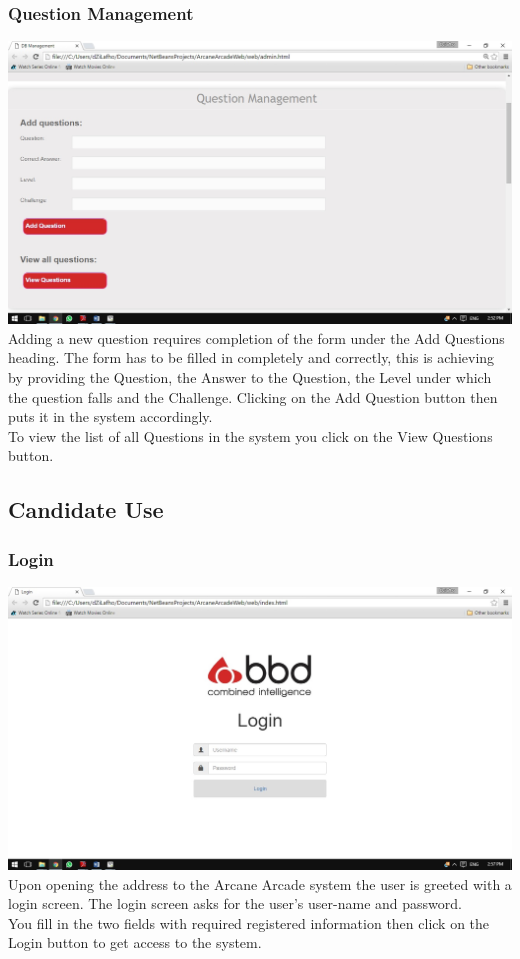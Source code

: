 \documentclass[english]{article}
\begin{document}
			\subsubsection{Question Management}
				\includegraphics[width=\linewidth]{QuestionManagement.jpg}
				Adding a new question requires completion of the form under the Add Questions heading. The form has to be filled in completely and correctly, this is achieving by providing the Question, the Answer to the Question, the Level under which the question falls and the Challenge. Clicking on the Add Question button then puts it in the system accordingly.
				\\[12pt]
				To view the list of all Questions in the system you click on the View Questions button.
			
		\subsection{Candidate Use}
			\subsubsection{Login}
				\includegraphics[width=\linewidth]{Login.jpg}
				Upon opening the address to the Arcane Arcade system the user is greeted with a login screen. The login screen asks for the user's user-name and password. 
				\\[12pt]
				You fill in the two fields with required registered information then click on the Login button to get access to the system.
			
\end{document}
